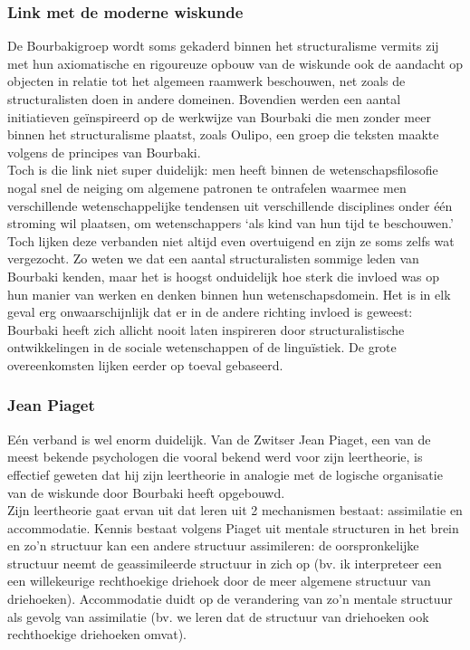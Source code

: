 \documentclass[a4paper,11pt]{article}
\begin{document}
\subsubsection{Link met de moderne wiskunde}
De Bourbakigroep wordt soms gekaderd binnen het structuralisme vermits zij met 
hun axiomatische en rigoureuze opbouw van de wiskunde ook de aandacht op 
objecten in relatie tot het algemeen raamwerk beschouwen, net zoals de 
structuralisten doen in andere domeinen. Bovendien werden een aantal initiatieven geïnspireerd op de 
werkwijze van Bourbaki die men zonder meer binnen het structuralisme plaatst, 
zoals Oulipo, een groep die teksten maakte volgens de principes van Bourbaki.\\

\noindent Toch is die link niet super duidelijk: men heeft binnen de wetenschapsfilosofie nogal snel de neiging om 
algemene patronen te ontrafelen waarmee men verschillende wetenschappelijke tendensen uit 
verschillende disciplines onder één stroming wil plaatsen, om wetenschappers `als 
kind van hun tijd te beschouwen.' Toch lijken deze verbanden niet altijd even overtuigend en zijn ze soms zelfs wat vergezocht. Zo weten we dat een aantal structuralisten sommige leden van Bourbaki kenden, maar
het is hoogst onduidelijk hoe sterk die invloed was op hun manier van 
werken en denken binnen hun wetenschapsdomein. Het is in elk geval erg 
onwaarschijnlijk dat er in de andere richting invloed is geweest: Bourbaki heeft zich allicht nooit
laten inspireren door structuralistische ontwikkelingen in de sociale wetenschappen of de 
linguïstiek. De grote overeenkomsten lijken eerder op toeval gebaseerd.\\

\subsubsection{Jean Piaget}\label{piaget}
Eén verband is wel enorm duidelijk. Van de Zwitser Jean Piaget, een van de meest bekende 
psychologen die vooral bekend werd voor zijn leertheorie, is effectief geweten 
dat hij zijn leertheorie in analogie met de logische organisatie van de wiskunde 
door Bourbaki heeft opgebouwd. \\

\noindent Zijn leertheorie gaat ervan uit dat leren uit 2 mechanismen bestaat: assimilatie en accommodatie. 
Kennis bestaat volgens Piaget uit mentale structuren in het brein en 
zo'n structuur kan een andere structuur assimileren: de oorspronkelijke structuur
neemt de geassimileerde structuur in zich op (bv. ik interpreteer een een willekeurige
rechthoekige driehoek door de meer algemene structuur van driehoeken). Accommodatie 
duidt op de verandering van zo'n mentale structuur als gevolg van assimilatie (bv. we leren
dat de structuur van driehoeken ook rechthoekige driehoeken omvat). \\
\end{document}
